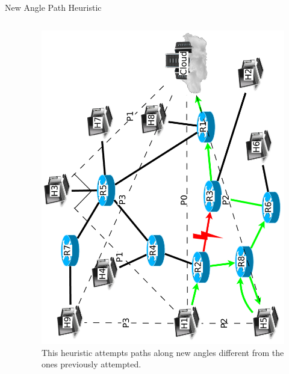 \documentclass[pdftex]{beamer}
\begin{document}
\begin{frame}{New Angle Path Heuristic}
\begin{columns}

\begin{column}{.5\textwidth}
\begin{algorithm}[H]
\DontPrintSemicolon
{}
\SetAlgoLined
\SetAlgoLongEnd
\scriptsize
{}
\caption{}
\small
\end{algorithm}
\end{column}
	
\begin{column}{.5\textwidth}
\begin{figure}
\includegraphics[height=\textwidth,angle=-90]{new_angle}
\caption{This heuristic attempts paths along new angles different from the ones previously attempted.}
\end{figure}
\end{column}

\end{columns}
\end{frame}
\end{document}
